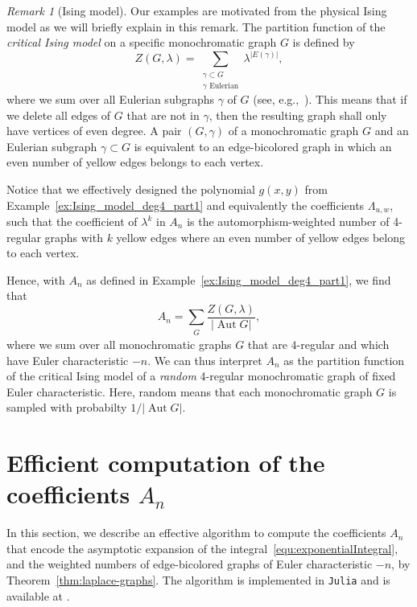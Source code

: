 \documentclass[english]{ourlematemasingle}
\numberwithin{theorem}{section}
\theoremstyle{remark}
\newtheorem{remark}[theorem]{Remark}
\newcommand{\colT}{yellow}
\DeclareMathOperator{\Aut}{Aut}
\begin{document}
\begin{remark}[Ising model]
\label{rmk:ising}
Our examples are motivated from the physical Ising model as we will briefly explain in this remark.
The partition function of the \emph{critical Ising model} on a specific monochromatic graph $G$ is defined by
$$
Z(G,\lambda) = \sum_{\substack{\gamma \subset G\\\gamma \text{ Eulerian}}} \lambda^{|E(\gamma)|},
$$
where we sum over all Eulerian subgraphs $\gamma$ of $G$ (see, e.g.,~\cite{MR2989454}). This means that if we delete all edges of $G$ that are not in $\gamma$, then the resulting graph shall only have vertices of even degree.
A pair $(G,\gamma)$ of a monochromatic graph $G$ and an Eulerian subgraph $\gamma \subset G$ is equivalent to an edge-bicolored graph in which an even number of \colT{} edges belongs to each vertex.

Notice that we effectively designed the polynomial $g(x,y)$ from Example~\ref{ex:Ising_model_deg4_part1} and equivalently the coefficients $\Lambda_{u,w}$, such that  the coefficient of $\lambda^k$ in $A_n$ is the
automorphism-weighted number of 4-regular graphs with $k$ \colT{} edges where an even number of \colT{} edges belong to each vertex.

Hence, with $A_n$ as defined in Example~\ref{ex:Ising_model_deg4_part1}, we find that
$$
A_n = \sum_{\substack{G}} \frac{Z(G,\lambda)}{|\Aut G|},
$$
where we sum over all monochromatic graphs $G$ that are $4$-regular 
and which have Euler characteristic $-n$. We can thus 
interpret $A_n$ as the partition function of the critical Ising 
model of a \emph{random} 4-regular monochromatic graph of fixed Euler characteristic. 
Here, random means that each monochromatic graph $G$ is sampled with probabilty $1/|\Aut G|$.
\end{remark}


\section[Efficient computation of the coefficients An]{Efficient computation of the coefficients $A_n$}
\label{sec:algo}

In this section, we describe an effective algorithm to compute the coefficients $A_n$ 
that encode the asymptotic expansion of the integral~\eqref{equ:exponentialIntegral}, 
and the weighted numbers of edge-bicolored graphs of Euler characteristic $-n$, 
by Theorem~\ref{thm:laplace-graphs}.
The algorithm is implemented in \texttt{Julia} and is available at \cite{mathrepo}.
\end{document}
